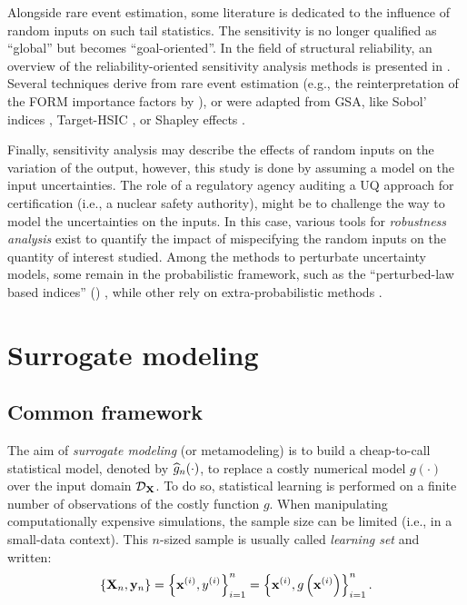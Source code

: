 Alongside rare event estimation, some literature is dedicated to the influence of random inputs on such tail statistics. 
The sensitivity is no longer qualified as ``global'' but becomes ``goal-oriented''. 
In the field of structural reliability, an overview of the reliability-oriented sensitivity analysis methods is presented in \citet{chabridon_2018_thesis}. 
Several techniques derive from rare event estimation (e.g., the reinterpretation of the FORM importance factors by \citealp{papaioannou_2021_rosa_form}), or were adapted from GSA, like Sobol' indices \citep{wei_2012_rosa,chabridon_2018_thesis,perrin_2019_rosa,ehre_2020_rosa}, Target-HSIC \citep{marrel_chabridon_2021}, or Shapley effects \citep{ilidrissi_2021_rosa}.  

Finally, sensitivity analysis may describe the effects of random inputs on the variation of the output, however, this study is done by assuming a model on the input uncertainties. 
The role of a regulatory agency auditing a UQ approach for certification (i.e., a nuclear safety authority), might be to challenge the way to model the uncertainties on the inputs.  
In this case, various tools for \textit{robustness analysis} exist to quantify the impact of mispecifying the random inputs on the quantity of interest studied. 
Among the methods to perturbate uncertainty models, some remain in the probabilistic framework, such as the ``perturbed-law based indices'' () \citep{lemaitre_2015_PLI,iooss_2022_pli}, while other rely on extra-probabilistic methods \citep{ajenjo_2022_structural_safety}. 




\section{Surrogate modeling} \label{sec:surrogate}

\subsection{Common framework}

The aim of \textit{surrogate modeling} (or metamodeling) is to build a cheap-to-call statistical model, 
denoted by $\widehat{g}_n(\cdot)$, to replace a costly numerical model $g(\cdot)$ over the input domain $\mathcal{D}_{{\bf X}}$. 
To do so, statistical learning is performed on a finite number of observations of the costly function $g$. 
When manipulating computationally expensive simulations, the sample size can be limited (i.e., in a small-data context). 
This $n$-sized sample is usually called \textit{learning set} and written: 
\begin{equation}
    \left\{{\bf X}_n, {\bf y}_n\right\} = \left\{{\bf x}^{(i)}, y^{(i)}\right\}_{i=1}^n
                                = \left\{{\bf x}^{(i)}, g\left({\bf x}^{(i)}\right)\right\}_{i=1}^n.    
\end{equation}

